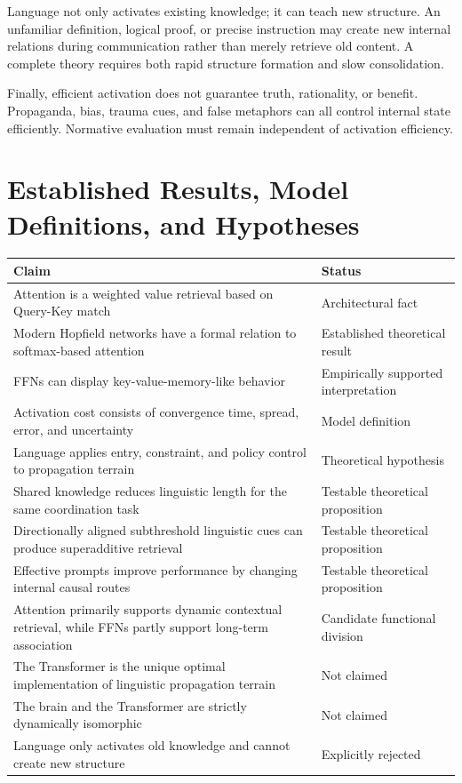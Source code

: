 \documentclass[11pt, a4paper]{article}
\begin{document}
Language not only activates existing knowledge; it can teach new structure. An unfamiliar definition, logical proof, or precise instruction may create new internal relations during communication rather than merely retrieve old content. A complete theory requires both rapid structure formation and slow consolidation.


Finally, efficient activation does not guarantee truth, rationality, or benefit. Propaganda, bias, trauma cues, and false metaphors can all control internal state efficiently. Normative evaluation must remain independent of activation efficiency.



\section{Established Results, Model Definitions, and Hypotheses}


\begin{center}\begin{tabularx}{\textwidth}{X p{}}\toprule
\textbf{Claim} & \textbf{Status} \\
\midrule
Attention is a weighted value retrieval based on Query-Key match & Architectural fact \\
Modern Hopfield networks have a formal relation to softmax-based attention & Established theoretical result \\
FFNs can display key-value-memory-like behavior & Empirically supported interpretation \\
Activation cost consists of convergence time, spread, error, and uncertainty & Model definition \\
Language applies entry, constraint, and policy control to propagation terrain & Theoretical hypothesis \\
Shared knowledge reduces linguistic length for the same coordination task & Testable theoretical proposition \\
Directionally aligned subthreshold linguistic cues can produce superadditive retrieval & Testable theoretical proposition \\
Effective prompts improve performance by changing internal causal routes & Testable theoretical proposition \\
Attention primarily supports dynamic contextual retrieval, while FFNs partly support long-term association & Candidate functional division \\
The Transformer is the unique optimal implementation of linguistic propagation terrain & Not claimed \\
The brain and the Transformer are strictly dynamically isomorphic & Not claimed \\
Language only activates old knowledge and cannot create new structure & Explicitly rejected \\
\bottomrule\end{tabularx}\end{center}
\end{document}
